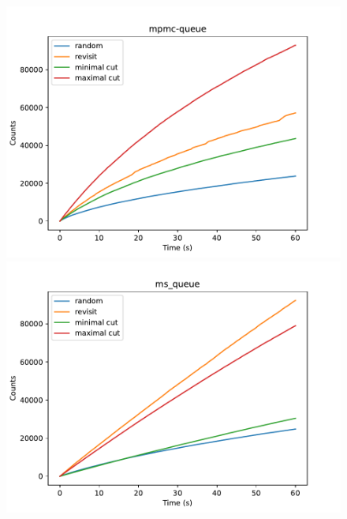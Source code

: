 \begin{figure}[h!]
	\begin{minipage}{0.45\textwidth}
		\centering
		\includegraphics[width=\textwidth]{figure/genmc-time/mpmc-queue.pdf}
	\end{minipage}
	\hfill
	\begin{minipage}{0.45\textwidth}
		\centering
		\includegraphics[width=\textwidth]{figure/genmc-time/ms_queue.pdf}
	\end{minipage}

	\vspace{0.5cm}


\end{figure}

